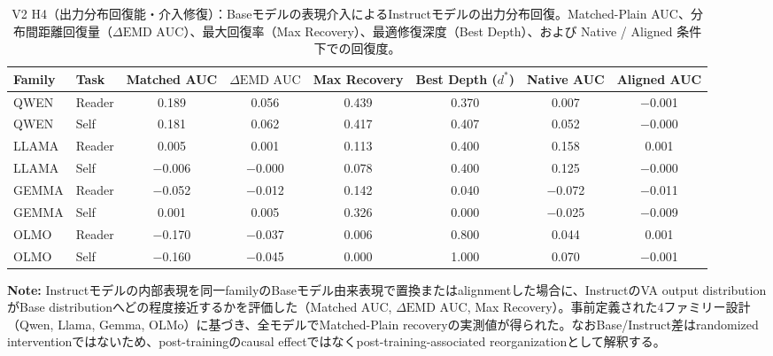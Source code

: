 \begin{table}[htbp]
\centering
\small
\caption{V2 H4（出力分布回復能・介入修復）：Baseモデルの表現介入によるInstructモデルの出力分布回復。Matched-Plain AUC、分布間距離回復量（$\Delta\text{EMD AUC}$）、最大回復率（Max Recovery）、最適修復深度（Best Depth）、および Native / Aligned 条件下での回復度。}
\label{tab:v2_distribution_recovery}
\begin{tabular}{ll cccc cc}
\toprule
\textbf{Family} & \textbf{Task} & \textbf{Matched AUC} & $\Delta\text{EMD AUC}$ & \textbf{Max Recovery} & \textbf{Best Depth ($d^*$)} & \textbf{Native AUC} & \textbf{Aligned AUC} \\
\midrule
QWEN       & Reader   & 0.189        & 0.056          & 0.439        & 0.370            & 0.007      & $-$0.001   \\
QWEN       & Self     & 0.181        & 0.062          & 0.417        & 0.407            & 0.052      & $-$0.000   \\
LLAMA      & Reader   & 0.005        & 0.001          & 0.113        & 0.400            & 0.158      & 0.001      \\
LLAMA      & Self     & $-$0.006     & $-$0.000       & 0.078        & 0.400            & 0.125      & $-$0.000   \\
GEMMA      & Reader   & $-$0.052     & $-$0.012       & 0.142        & 0.040            & $-$0.072   & $-$0.011   \\
GEMMA      & Self     & 0.001        & 0.005          & 0.326        & 0.000            & $-$0.025   & $-$0.009   \\
OLMO       & Reader   & $-$0.170     & $-$0.037       & 0.006        & 0.800            & 0.044      & 0.001      \\
OLMO       & Self     & $-$0.160     & $-$0.045       & 0.000        & 1.000            & 0.070      & $-$0.001   \\
\bottomrule
\end{tabular}
\vspace{1ex}
\begin{minipage}{\linewidth}
\footnotesize
\textbf{Note:} Instructモデルの内部表現を同一familyのBaseモデル由来表現で置換またはalignmentした場合に、InstructのVA output distributionがBase distributionへどの程度接近するかを評価した（Matched AUC, $\Delta\text{EMD AUC}$, Max Recovery）。事前定義された4ファミリー設計（Qwen, Llama, Gemma, OLMo）に基づき、全モデルでMatched-Plain recoveryの実測値が得られた。なおBase/Instruct差はrandomized interventionではないため、post-trainingのcausal effectではなくpost-training-associated reorganizationとして解釈する。
\end{minipage}
\end{table}